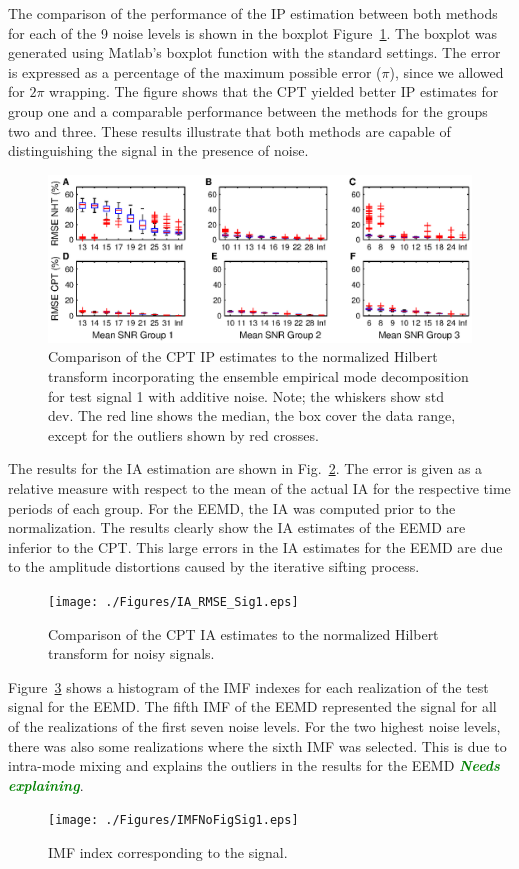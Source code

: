 \documentclass[a4paper]{IEEEtran}
\newcommand{\dean}[1]{\textsf{\emph{\textbf{\textcolor{green}{#1}}}}}
\begin{document}
The comparison of the performance of the IP estimation between both methods for each of the 9 noise levels is shown in the boxplot Figure~\ref{fig:RMSEComparison}. The boxplot was generated using Matlab's boxplot function with the standard settings. The error is expressed as a percentage of the maximum possible error ($\pi$), since we allowed for $2\pi$ wrapping. The figure shows that the CPT yielded better IP estimates for group one and a comparable performance between the methods for the groups two and three. These results illustrate that both methods are capable of distinguishing the signal in the presence of noise. 
\begin{figure}[!ht]\label{fig:RMSEComparison}
    \centering
        \includegraphics[scale=1]{./Figures/SNRcomparisonFigure.eps}
    \caption{Comparison of the CPT IP estimates to the normalized Hilbert transform incorporating the ensemble empirical mode decomposition for test signal 1 with additive noise. Note; the whiskers show std dev. The red line shows the median, the box cover the data range, except for the outliers shown by red crosses.}
\end{figure}

The results for the IA estimation are shown in Fig.~\ref{fig:RMSEComparisonSig1_IA}. The error is given as a relative measure with respect to the mean of the actual IA for the respective time periods of each group. For the EEMD, the IA was computed prior to the normalization. The results clearly show the IA estimates of the EEMD are inferior to the CPT. This large errors in the IA estimates for the EEMD are due to the amplitude distortions caused by the iterative sifting process.  
\begin{figure}[!ht]\label{fig:RMSEComparisonSig1_IA}
    \centering
        \texttt{[image: ./Figures/IA\_RMSE\_Sig1.eps]}
    \caption{Comparison of the CPT IA estimates to the normalized Hilbert transform for noisy signals.}
\end{figure}
Figure~\ref{fig:IMFNoNHT} shows a histogram of the IMF indexes for each realization of the test signal for the EEMD. The fifth IMF of the EEMD represented the signal for all of the realizations of the first seven noise levels. For the two highest noise levels, there was also some realizations where the sixth IMF was selected. This is due to intra-mode mixing and explains the outliers in the results for the EEMD \dean{Needs explaining}.   
\begin{figure}[!ht]\label{fig:IMFNoNHT}
    \centering
        \texttt{[image: ./Figures/IMFNoFigSig1.eps]}
    \caption{IMF index corresponding to the signal.}
\end{figure}
\end{document}

